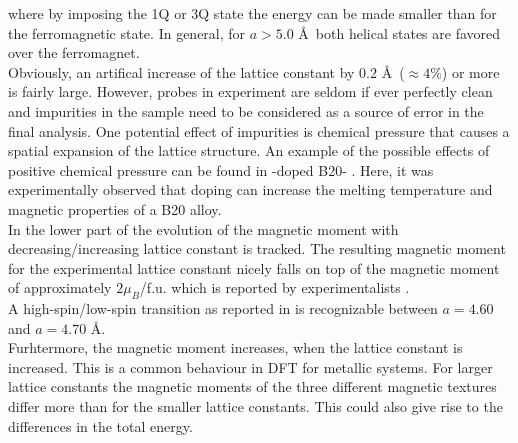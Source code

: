 \documentclass [a4paper, 12pt]{article}
\begin{document}
where by imposing the 1Q or 3Q state the energy can be made smaller than for the ferromagnetic state.
In general, for $a>5.0$ \AA \, both helical states are favored over the ferromagnet.
\\
Obviously, an artifical increase of the lattice constant by
$0.2$ \AA \, ($\approx 4 \%$) or more is fairly large.
However, probes in experiment are seldom if ever perfectly clean and
impurities in the sample need to be considered as a source of error in the
final analysis. One potential
effect of impurities is chemical pressure that causes a spatial expansion of the
lattice structure.
An example of the possible effects of positive chemical pressure
can be found in -doped B20- \cite{stolt_chemical_2018}. 
Here, it was experimentally observed
that doping can increase the melting temperature and magnetic properties of a B20 alloy.
\\
In the lower part of  the evolution of the magnetic moment
with decreasing/increasing lattice constant is tracked.
The resulting magnetic moment for the experimental lattice constant nicely falls 
on top of the magnetic moment of approximately $2 \mu_{B}$/f.u. 
which is reported by experimentalists \cite{yaouanc_magnetic_2017}.
\\
A high-spin/low-spin transition as reported in \cite{rosler_ab_2012}
is recognizable between $a=4.60$ and $a=4.70$ \AA.
\\
Furhtermore, the magnetic moment increases, when the lattice constant is increased.
This is a common behaviour in DFT for metallic systems.
For larger lattice constants the magnetic moments of the three different
magnetic textures differ more than for the smaller lattice constants.
This could also give rise to the differences in the total energy.\\
\end{document}
